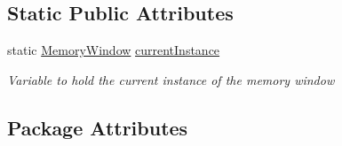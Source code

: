 \subsection*{Static Public Attributes}
\begin{DoxyCompactItemize}
\item 
static \hyperlink{class_c_p_u___o_s___simulator_1_1_memory_window}{Memory\+Window} \hyperlink{class_c_p_u___o_s___simulator_1_1_memory_window_a870b795e3b919a82888ad608ab24d61a}{current\+Instance}
\begin{DoxyCompactList}\small\item\em Variable to hold the current instance of the memory window \end{DoxyCompactList}\end{DoxyCompactItemize}
\subsection*{Package Attributes}
